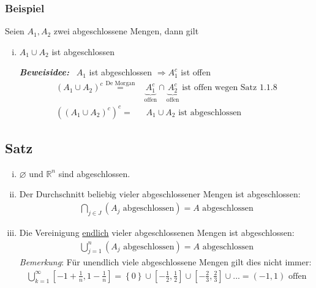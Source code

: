 \documentclass[11pt,a4paper]{book}
\newcommand {\Rn}	{\mathbb{R}^n}
\newcommand{\1}    	{\mathbbm{1}}
\newcommand{\Beweis}[1][Beweis]
{\begin{mdframed}[backgroundcolor=gray!10,linewidth=0pt]\noindent\textit{\textbf{{#1}:}}~}
\newcommand{\QED}	{\end{mdframed}}
\begin{document}
\subsubsection{Beispiel}
Seien \(A_1, A_2\) zwei abgeschlossene Mengen, dann gilt
\begin{enumerate}[(i)]
	\item \(A_1 \cup A_2\) ist abgeschlossen \\
	\Beweis[Beweisidee] \(A_1\) ist abgeschlossen \(\Rightarrow A_1^c\) ist offen \\
	\begin{align*}
		\left( A_1 \cup A_2 \right)^c \stackrel{\textrm{De Morgan}}{=}& \underbrace{A_1^c}_{\textrm{offen}} \cap \underbrace{A_2^c}_{\textrm{offen}} \textrm{ ist offen wegen Satz 1.1.8} \\
		\left( \left( A_1 \cup A_2 \right)^c \right)^c =& ~A_1 \cup A_2 \textrm{ ist abgeschlossen}
	\end{align*}
	\QED
\end{enumerate}

\subsection{Satz}
\begin{enumerate}[(i)]
	\item \(\varnothing\) und \(\Rn\) sind abgeschlossen.
	\item Der Durchschnitt beliebig vieler abgeschlossener Mengen ist abgeschlossen:
	\begin{align*}
		\bigcap_{j \in J} \left( A_j \textrm{ abgeschlossen} \right) = A \textrm{ abgeschlossen}
	\end{align*}
	\item Die Vereinigung \underline{endlich} vieler abgeschlossenen Mengen ist abgeschlossen:
	\begin{align*}
		\bigcup_{j = 1}^{n} \left( A_j \textrm{ abgeschlossen} \right) = A \textrm{ abgeschlossen}
	\end{align*}
	\textit{Bemerkung}: Für unendlich viele abgeschlossene Mengen gilt dies nicht immer:
	\begin{align*}
		\bigcup_{k = 1}^{\infty} \left[ -1 + \frac{1}{n}, 1 - \frac{1}{n} \right] = \left\{ 0 \right\} \cup \left[ -\frac{1}{2}, \frac{1}{2} \right] \cup \left[ -\frac{2}{3}, \frac{2}{3} \right] \cup ... = \left( -1, 1 \right) \textrm{ offen}
	\end{align*}	 
\end{enumerate}
\end{document}
